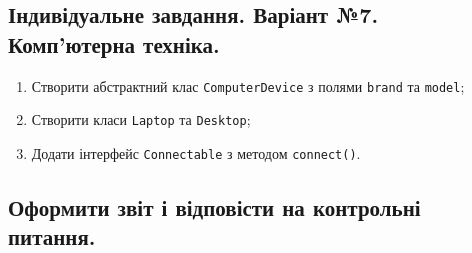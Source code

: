 \subsection{Індивідуальне завдання. Варіант №7. Комп'ютерна техніка.}

\begin{enumerate}
    \item Створити абстрактний клас \texttt{ComputerDevice} з полями \texttt{brand} та \texttt{model};
    \item Створити класи \texttt{Laptop} та \texttt{Desktop};
    \item Додати інтерфейс \texttt{Connectable} з методом \texttt{connect()}.
\end{enumerate}

\subsection{Оформити звіт і відповісти на контрольні питання.}



